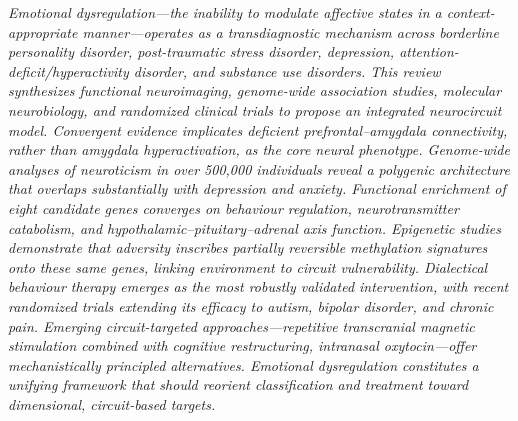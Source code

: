 \documentclass[10pt]{article}
\begin{document}
{\TSBody\itshape
Emotional dysregulation---the inability to modulate affective states in a context-appropriate manner---operates as a transdiagnostic mechanism across borderline personality disorder, post-traumatic stress disorder, depression, attention-deficit/hyperactivity disorder, and substance use disorders. This review synthesizes functional neuroimaging, genome-wide association studies, molecular neurobiology, and randomized clinical trials to propose an integrated neurocircuit model. Convergent evidence implicates deficient prefrontal--amygdala connectivity, rather than amygdala hyperactivation, as the core neural phenotype. Genome-wide analyses of neuroticism in over 500,000 individuals reveal a polygenic architecture that overlaps substantially with depression and anxiety. Functional enrichment of eight candidate genes converges on behaviour regulation, neurotransmitter catabolism, and hypothalamic--pituitary--adrenal axis function. Epigenetic studies demonstrate that adversity inscribes partially reversible methylation signatures onto these same genes, linking environment to circuit vulnerability. Dialectical behaviour therapy emerges as the most robustly validated intervention, with recent randomized trials extending its efficacy to autism, bipolar disorder, and chronic pain. Emerging circuit-targeted approaches---repetitive transcranial magnetic stimulation combined with cognitive restructuring, intranasal oxytocin---offer mechanistically principled alternatives. Emotional dysregulation constitutes a unifying framework that should reorient classification and treatment toward dimensional, circuit-based targets.\par}





\end{document}
